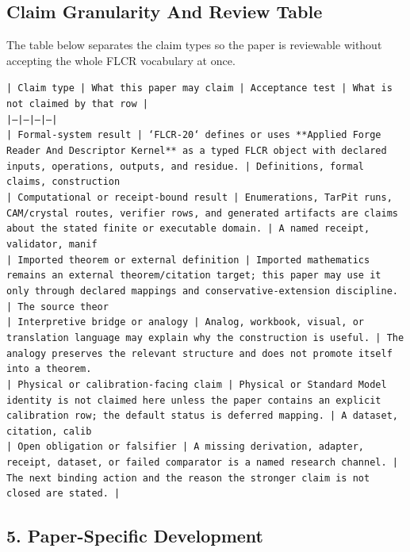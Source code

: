 \documentclass[11pt]{article}
\begin{document}
\subsection*{Claim Granularity And Review Table}

The table below separates the claim types so the paper is reviewable without accepting the whole FLCR vocabulary at once.

\noindent\texttt{| Claim type | What this paper may claim | Acceptance test | What is not claimed by that row |}\\
\noindent\texttt{|---|---|---|---|}\\
\noindent\texttt{| Formal-system result | `FLCR-20` defines or uses **Applied Forge Reader And Descriptor Kernel** as a typed FLCR object with declared inputs, operations, outputs, and residue. | Definitions, formal claims, construction }\\
\noindent\texttt{| Computational or receipt-bound result | Enumerations, TarPit runs, CAM/crystal routes, verifier rows, and generated artifacts are claims about the stated finite or executable domain. | A named receipt, validator, manif}\\
\noindent\texttt{| Imported theorem or external definition | Imported mathematics remains an external theorem/citation target; this paper may use it only through declared mappings and conservative-extension discipline. | The source theor}\\
\noindent\texttt{| Interpretive bridge or analogy | Analog, workbook, visual, or translation language may explain why the construction is useful. | The analogy preserves the relevant structure and does not promote itself into a theorem. }\\
\noindent\texttt{| Physical or calibration-facing claim | Physical or Standard Model identity is not claimed here unless the paper contains an explicit calibration row; the default status is deferred mapping. | A dataset, citation, calib}\\
\noindent\texttt{| Open obligation or falsifier | A missing derivation, adapter, receipt, dataset, or failed comparator is a named research channel. | The next binding action and the reason the stronger claim is not closed are stated. | }\\

\subsection*{5. Paper-Specific Development}
\end{document}
